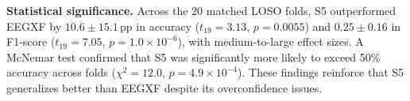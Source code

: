 \documentclass{article}
\newcommand{\eegtrans}{EEGXF}
\begin{document}
\textbf{Statistical significance.}
Across the 20 matched LOSO folds, S5 outperformed \eegtrans{} by $10.6 \pm 15.1$\,pp in accuracy ($t_{19} = 3.13$, $p = 0.0055$) and $0.25 \pm 0.16$ in F1-score ($t_{19} = 7.05$, $p = 1.0 \times 10^{-6}$), with medium-to-large effect sizes.
A McNemar test confirmed that S5 was significantly more likely to exceed 50\% accuracy across folds ($\chi^2 = 12.0$, $p = 4.9 \times 10^{-4}$).
These findings reinforce that S5 generalizes better than \eegtrans{} despite its overconfidence issues.


\end{document}
